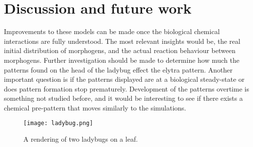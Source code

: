 \section{Discussion and future work}
Improvements to these models can be made once the biological chemical interactions are fully understood. The most relevant insights would be, the real initial distribution of morphogens, and the actual reaction behaviour between morphogens. Further investigation should be made to determine how much the patterns found on the head of the ladybug effect the elytra pattern. Another important question is if the patterns displayed are at a biological steady-state or does pattern formation stop prematurely. Development of the patterns overtime is something not studied before, and it would be interesting to see if there exists a chemical pre-pattern that moves similarly to the simulations.


\begin{figure}[p]
	\centering
	\texttt{[image: ladybug.png]}
	\caption{A rendering of two ladybugs on a leaf.}
	\label{fig:ladybugRender}
\end{figure}
